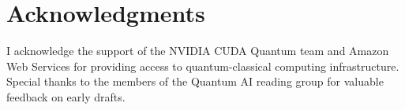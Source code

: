 \documentclass[12pt, a4paper, oneside, notitlepage]{report}
\theoremstyle{plain}
\begin{document}
\chapter*{Acknowledgments}
I acknowledge the support of the NVIDIA CUDA Quantum team and Amazon Web
Services for providing access to quantum-classical computing infrastructure.
Special thanks to the members of the Quantum AI reading group for valuable
feedback on early drafts.

\tableofcontents
\listoffigures
\listoftables











\appendix


\end{document}
